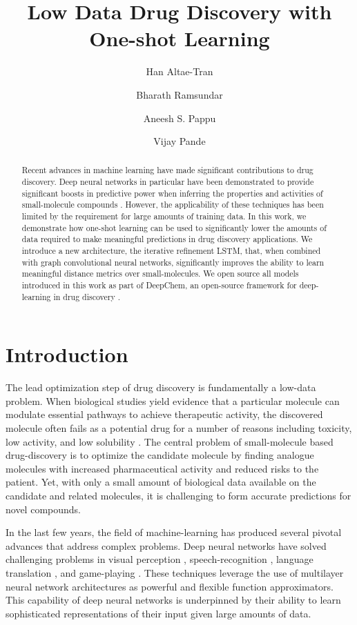\documentclass[journal=jacsat,manuscript=article]{achemso}
\author{Han Altae-Tran}
\affiliation{Department of Biological Engineering, Massachusetts Institute of Technology}
\author{Bharath Ramsundar}
\affiliation{Department of Computer Science, Stanford University}
\author{Aneesh S. Pappu}
\affiliation{Department of Computer Science, Stanford University}
\author{Vijay Pande}
\affiliation{Department of Chemistry, Stanford University}
\title{Low Data Drug Discovery with One-shot Learning}
\begin{document}
\maketitle

\begin{abstract}
Recent advances in machine learning have made significant contributions to drug discovery. Deep neural networks in particular have been demonstrated to provide significant boosts in predictive power when inferring the properties and activities of small-molecule compounds \cite{ma2015deep}. However, the applicability of these techniques has been limited by the requirement for large amounts of training data. In this work, we demonstrate how one-shot learning can be used to significantly lower the amounts of data required to make meaningful predictions in drug discovery applications. We introduce a new architecture, the iterative refinement LSTM, that, when combined with graph convolutional neural networks, significantly improves the ability to learn meaningful distance metrics over small-molecules. We open source all models introduced in this work as part of DeepChem, an open-source framework for deep-learning in drug discovery
\cite{ram2016}.
\end{abstract}

\section{Introduction}
The lead optimization step of drug discovery is fundamentally a low-data problem. When biological studies yield evidence that a particular molecule can modulate essential pathways to achieve therapeutic activity, the discovered molecule often fails as a potential drug for a number of reasons including toxicity, low activity, and low solubility \cite{waring2015analysis}. The central problem of small-molecule based drug-discovery is to optimize the candidate molecule by finding analogue molecules with increased pharmaceutical activity and reduced risks to the patient. Yet, with only a small amount of biological data available on the candidate and related molecules, it is challenging to form accurate predictions for novel compounds.

In the last few years, the field of machine-learning has produced several pivotal advances that address complex problems. Deep neural networks have solved challenging problems in visual perception \cite{ILSVRC15}, speech-recognition \cite{deng2013new}, language translation \cite{wu2016google}, and game-playing \cite{silver2016mastering}. These techniques leverage the use of multilayer neural network architectures as powerful and flexible function approximators. This capability of deep neural networks is underpinned by their ability to learn sophisticated representations of their input given large amounts of data.
\end{document}
